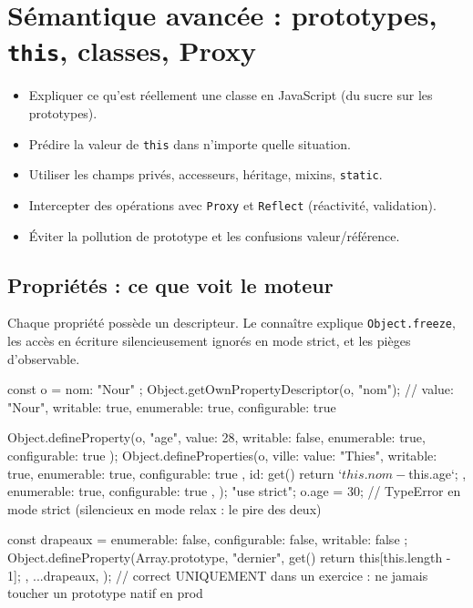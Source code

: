 \documentclass[12pt,a4paper,twoside,openright]{book}
\begin{document}
\chapter{S\'emantique avanc\'ee : prototypes, \texttt{this}, classes, Proxy}
\label{ch-js-avance}

\begin{objectif}
\begin{itemize}
  \item Expliquer ce qu'est r\'eellement une classe en JavaScript (du sucre sur les prototypes).
  \item Pr\'edire la valeur de \texttt{this} dans n'importe quelle situation.
  \item Utiliser les champs priv\'es, accesseurs, h\'eritage, mixins, \texttt{static}.
  \item Intercepter des op\'erations avec \texttt{Proxy} et \texttt{Reflect} (r\'eactivit\'e, validation).
  \item \'Eviter la pollution de prototype et les confusions valeur/r\'ef\'erence.
\end{itemize}
\end{objectif}

\section{Propri\'et\'es : ce que voit le moteur}

Chaque propri\'et\'e poss\`ede un descripteur. Le conna\^itre explique \texttt{Object.freeze},
les acc\`es en \'ecriture silencieusement ignor\'es en mode strict, et les pi\`eges d'observable.

\begin{codejs}
const o = { nom: "Nour" };
Object.getOwnPropertyDescriptor(o, "nom");
// { value: "Nour", writable: true, enumerable: true, configurable: true }

Object.defineProperty(o, "age", { value: 28, writable: false, enumerable: true, configurable: true });
Object.defineProperties(o, {
  ville: { value: "Thies", writable: true, enumerable: true, configurable: true },
  id: { get() { return `${this.nom}-${this.age}`; }, enumerable: true, configurable: true },
});
"use strict";
o.age = 30;          // TypeError en mode strict (silencieux en mode relax : le pire des deux)

const drapeaux = { enumerable: false, configurable: false, writable: false };
Object.defineProperty(Array.prototype, "dernier", {
  get() { return this[this.length - 1]; },
  ...drapeaux,
});   // correct UNIQUEMENT dans un exercice : ne jamais toucher un prototype natif en prod
\end{codejs}
\end{document}

